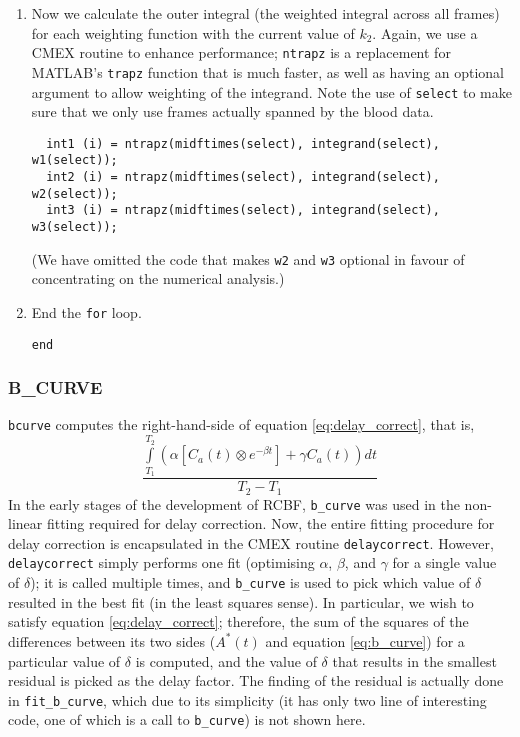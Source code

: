 \documentclass[12pt]{article}
\def\code#1{{\tt #1}}
\begin{document}
\begin{enumerate}
\item Now we calculate the outer integral (the weighted integral
  across all frames) for each weighting function with the current
  value of $k_2$.  Again, we use a CMEX routine to enhance
  performance; \code{ntrapz} is a replacement for MATLAB's
  \code{trapz} function that is much faster, as well as having an
  optional argument to allow weighting of the integrand.  Note the use
  of \code{select} to make sure that we only use frames actually
  spanned by the blood data.
\begin{verbatim}
  int1 (i) = ntrapz(midftimes(select), integrand(select), w1(select));
  int2 (i) = ntrapz(midftimes(select), integrand(select), w2(select));
  int3 (i) = ntrapz(midftimes(select), integrand(select), w3(select));
\end{verbatim}
(We have omitted the code that makes \code{w2} and \code{w3}
optional in favour of concentrating on the numerical analysis.)

\item End the \code{for} loop.
\begin{verbatim}
end
\end{verbatim}

\end{enumerate}


\subsubsection{B\_CURVE}

\code{bcurve} computes the right-hand-side of equation
\ref{eq:delay_correct}, that is,
\begin{equation}
\frac{\int\limits_{T_1}^{T_2} 
  \left( \alpha 
    \left[ C_a(t) \otimes  e^{-\beta t} \right] 
  + \gamma C_a(t) \right) dt} {T_2 - T_1}
\label{eq:b_curve}
\end{equation}
In the early stages of the development of RCBF, \code{b\_curve} was
used in the non-linear fitting required for delay correction.  Now,
the entire fitting procedure for delay correction is encapsulated in
the CMEX routine \code{delaycorrect}.  However, \code{delaycorrect}
simply performs one fit (optimising $\alpha$, $\beta$, and $\gamma$
for a single value of $\delta$); it is called multiple times, and
\code{b\_curve} is used to pick which value of $\delta$ resulted in
the best fit (in the least squares sense).  In particular, we wish to
satisfy equation \ref{eq:delay_correct}; therefore, the sum of the
squares of the differences between its two sides ($A^{*} (t)$ and
equation \ref{eq:b_curve}) for a particular value of $\delta$ is
computed, and the value of $\delta$ that results in the smallest
residual is picked as the delay factor.  The finding of the residual
is actually done in \code{fit\_b\_curve}, which due to its simplicity
(it has only two line of interesting code, one of which is a call to
\code{b\_curve}) is not shown here.
\end{document}
